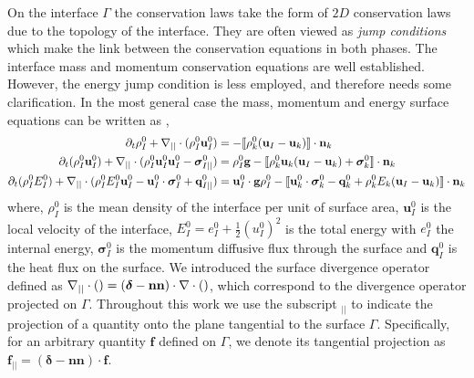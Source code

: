 On the interface $\Gamma$ the conservation laws take the form of $2D$ conservation laws due to the topology of the interface. 
They are often viewed as \textit{jump conditions} which make the link between the conservation equations in both phases. 
The interface mass and momentum conservation equations are well established.
However, the energy jump condition is less employed, and therefore needs some clarification.
In the most general case the mass, momentum and energy surface equations can be written as \citep{ishii2010thermo,morel2015mathematical,bothe2022sharp}, 
\begin{align}
    \label{eq:dt_rhoI}
    \partial_t \rho_I^0
    + \mathbf{\nabla}_{||}\cdot (\rho_I^0\textbf{u}_{I}^0)
    &= 
    -\llbracket 
        \rho_k^0 (\textbf{u}_I - \textbf{u}_k)
     \rrbracket \cdot \textbf{n}_k
    \\
    \label{eq:dt_rhoIu_I}
    \partial_t (\rho_I^0\textbf{u}_I^0)  
    + \mathbf{\nabla}_{||}\cdot (
    \rho_I^0\textbf{u}_I^0\textbf{u}_{I}^0
    - \bm{\sigma}_{I||}^0)
    &= 
    \rho_I^0 \textbf{g}
    - \llbracket 
        \rho_k^0 \textbf{u}_k (\textbf{u}_I - \textbf{u}_k)
        + \bm\sigma^0_k
     \rrbracket \cdot \textbf{n}_k
    \\
    \label{eq:dt_rhoIE_I}
    \partial_t (\rho_I^0E_I^0)  
    + \mathbf{\nabla}_{||}\cdot (
        \rho_I^0 E_I^0\textbf{u}_{I}^0
        - \textbf{u}_I^0 \cdot \bm{\sigma}_I^0 
        + \textbf{q}_{I||}^0
        )
    &= 
    \textbf{u}_I^0 \cdot \textbf{g}  \rho_I^0
    - \llbracket \textbf{u}_k^0 \cdot \bm{\sigma}_k^0 - \textbf{q}_k^0
    + \rho_k^0 E_k (\textbf{u}_I - \textbf{u}_k)
     \rrbracket \cdot \textbf{n}_k
\end{align} 
where, $\rho_I^0$ is the mean density of the interface per unit of surface area,  
$\textbf{u}_I^0$ is the local velocity of the interface, $E_I^0 = e_I^0 + \frac{1}{2}(u_I^0)^2$ is the total energy with $e_I^0$ the internal energy, $\bm{\sigma}_I^0$ is the momentum diffusive flux through the surface and $\textbf{q}_I^0$ is the heat flux on the surface.  
We introduced the surface divergence operator defined as $\mathbf{\nabla}_{||}\cdot ()= (\bm\delta-\textbf{nn})\cdot \mathbf{\nabla}\cdot ()$, which correspond to the divergence operator projected on $\Gamma$. 
Throughout this work we use the subscript  $_{||}$ to indicate the projection of a quantity onto the plane tangential to the surface $\Gamma$. 
Specifically, for an arbitrary quantity $\textbf{f}$ defined on $\Gamma$, we denote its tangential projection as $\textbf{f}_{||} = (\bm\delta-\textbf{nn})\cdot \textbf{f}$. 
